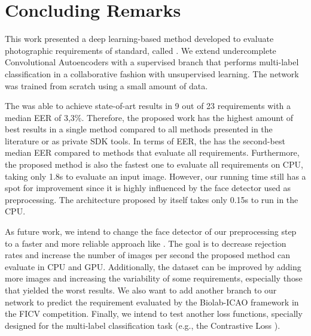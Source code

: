 \section{Concluding Remarks}

This work presented a deep learning-based method developed to evaluate photographic requirements of \icao standard, called \methodname. We extend undercomplete Convolutional Autoencoders with a supervised branch that performs multi-label classification in a collaborative fashion with unsupervised learning. The network was trained from scratch using a small amount of data. 

The \methodname was able to achieve state-of-art results in 9 out of 23 requirements with a median EER of 3,3\%. Therefore, the proposed work has the highest amount of best results in a single method compared to all methods presented in the literature or as private SDK tools. In terms of EER, the \methodname has the second-best median EER compared to methods that evaluate all requirements. Furthermore, the proposed method is also the fastest one to evaluate all requirements on CPU, taking only 1.8s to evaluate an input image. However, our running time still has a spot for improvement since it is highly influenced by the face detector used as preprocessing. The architecture proposed by itself takes only 0.15s to run in the CPU.

As future work, we intend to change the face detector of our preprocessing step to a faster and more reliable approach like \cite{faceboxes}. The goal is to decrease rejection rates and increase the number of images per second the proposed method can evaluate in CPU and GPU. Additionally, the dataset can be improved by adding more images and increasing the variability of some requirements, especially those that yielded the worst results. We also want to add another branch to our network to predict the \citeReq{\eyecenterlocation} requirement evaluated by the Biolab-ICAO framework in the FICV competition. Finally, we intend to test another loss functions, specially designed for the multi-label classification task (e.g., the Contrastive Loss \citep{khosla2020supervised}).

